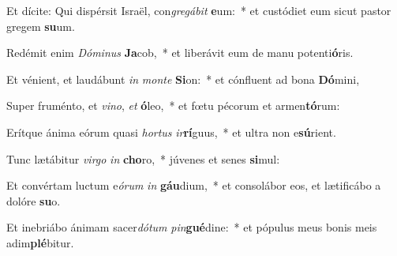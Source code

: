 \item Et dícite: Qui dispérsit Israël, con\textit{gre}\textit{gá}\textit{bit} \textbf{e}um:~* et custódiet eum sicut pastor gregem \textbf{su}um.
\item Redémit enim \textit{Dó}\textit{mi}\textit{nus} \textbf{Ja}cob,~* et liberávit eum de manu potenti\textbf{ó}ris.
\item Et vénient, et laudábunt \textit{in} \textit{mon}\textit{te} \textbf{Si}on:~* et cónfluent ad bona \textbf{Dó}mini,
\item Super fruménto, et \textit{vi}\textit{no}, \textit{et} \textbf{ó}leo,~* et fœtu pécorum et armen\textbf{tó}rum:
\item Erítque ánima eórum quasi \textit{hor}\textit{tus} \textit{ir}\textbf{rí}guus,~* et ultra non e\textbf{sú}rient.
\item Tunc lætábitur \textit{vir}\textit{go} \textit{in} \textbf{cho}ro,~* júvenes et senes \textbf{si}mul:
\item Et convértam luctum e\textit{ó}\textit{rum} \textit{in} \textbf{gáu}dium,~* et consolábor eos, et lætificábo a dolóre \textbf{su}o.
\item Et inebriábo ánimam sacer\textit{dó}\textit{tum} \textit{pin}\textbf{gué}dine:~* et pópulus meus bonis meis adim\textbf{plé}bitur.
